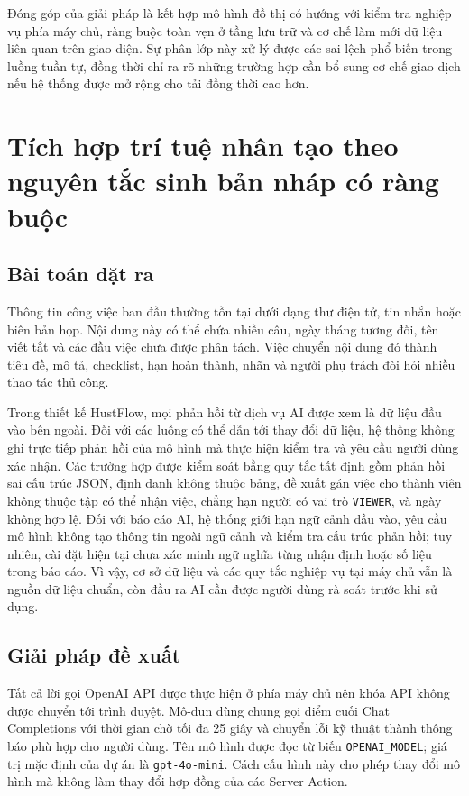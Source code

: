 \documentclass[../DoAn.tex]{subfiles}
\begin{document}
Đóng góp của giải pháp là kết hợp mô hình đồ thị có hướng với kiểm tra nghiệp vụ phía máy chủ, ràng buộc toàn vẹn ở tầng lưu trữ và cơ chế làm mới dữ liệu liên quan trên giao diện. Sự phân lớp này xử lý được các sai lệch phổ biến trong luồng tuần tự, đồng thời chỉ ra rõ những trường hợp cần bổ sung cơ chế giao dịch nếu hệ thống được mở rộng cho tải đồng thời cao hơn.

\section{Tích hợp trí tuệ nhân tạo theo nguyên tắc sinh bản nháp có ràng buộc}
\label{section:5.3}

\subsection{Bài toán đặt ra}
\label{subsection:5.3.1}

Thông tin công việc ban đầu thường tồn tại dưới dạng thư điện tử, tin nhắn hoặc biên bản họp. Nội dung này có thể chứa nhiều câu, ngày tháng tương đối, tên viết tắt và các đầu việc chưa được phân tách. Việc chuyển nội dung đó thành tiêu đề, mô tả, checklist, hạn hoàn thành, nhãn và người phụ trách đòi hỏi nhiều thao tác thủ công.

Trong thiết kế HustFlow, mọi phản hồi từ dịch vụ AI được xem là dữ liệu đầu vào bên ngoài. Đối với các luồng có thể dẫn tới thay đổi dữ liệu, hệ thống không ghi trực tiếp phản hồi của mô hình mà thực hiện kiểm tra và yêu cầu người dùng xác nhận. Các trường hợp được kiểm soát bằng quy tắc tất định gồm phản hồi sai cấu trúc JSON, định danh không thuộc bảng, đề xuất gán việc cho thành viên không thuộc tập có thể nhận việc, chẳng hạn người có vai trò \texttt{VIEWER}, và ngày không hợp lệ. Đối với báo cáo AI, hệ thống giới hạn ngữ cảnh đầu vào, yêu cầu mô hình không tạo thông tin ngoài ngữ cảnh và kiểm tra cấu trúc phản hồi; tuy nhiên, cài đặt hiện tại chưa xác minh ngữ nghĩa từng nhận định hoặc số liệu trong báo cáo. Vì vậy, cơ sở dữ liệu và các quy tắc nghiệp vụ tại máy chủ vẫn là nguồn dữ liệu chuẩn, còn đầu ra AI cần được người dùng rà soát trước khi sử dụng.

\subsection{Giải pháp đề xuất}
\label{subsection:5.3.2}

Tất cả lời gọi OpenAI API \cite{openai} được thực hiện ở phía máy chủ nên khóa API không được chuyển tới trình duyệt. Mô-đun dùng chung gọi điểm cuối Chat Completions với thời gian chờ tối đa 25 giây và chuyển lỗi kỹ thuật thành thông báo phù hợp cho người dùng. Tên mô hình được đọc từ biến \texttt{OPENAI\_MODEL}; giá trị mặc định của dự án là \texttt{gpt-4o-mini}. Cách cấu hình này cho phép thay đổi mô hình mà không làm thay đổi hợp đồng của các Server Action.
\end{document}
